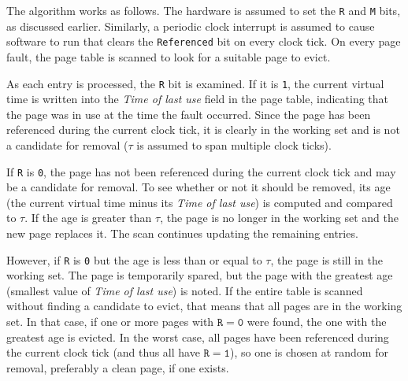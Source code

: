 The algorithm works as follows. The hardware is assumed to set the \texttt{R} and
\texttt{M} bits, as discussed earlier. Similarly, a periodic clock interrupt is assumed to
cause software to run that clears the \texttt{Referenced} bit on every clock tick. On
every page fault, the page table is scanned to look for a suitable page to
evict.

As each entry is processed, the \texttt{R} bit is examined. If it is \texttt{1}, the
current virtual time is written into the \emph{Time of last use} field in the page table,
indicating that the page was in use at the time the fault occurred. Since the page has
been referenced during the current clock tick, it is clearly in the working set and is not
a candidate for removal ($\mathtt{\tau}$ is assumed to span multiple clock ticks).

If \texttt{R} is \texttt{0}, the page has not been referenced during the current clock
tick and may be a candidate for removal. To see whether or not it should be removed, its
age (the current virtual time minus its \emph{Time of last use}) is computed and compared
to $\mathtt{\tau}$. If the age is greater than $\mathtt{\tau}$, the page is no longer in
the working set and the new page replaces it. The scan continues updating the remaining
entries.

However, if \texttt{R} is \texttt{0} but the age is less than or equal to $\mathtt{\tau}$,
the page is still in the working set. The page is temporarily spared, but the page with
the greatest age (smallest value of \emph{Time of last use}) is noted. If the entire table
is scanned without finding a candidate to evict, that means that all pages are in the
working set. In that case, if one or more pages with $\mathtt{R = 0}$ were found, the one
with the greatest age is evicted. In the worst case, all pages have been referenced during
the current clock tick (and thus all have $\mathtt{R = 1}$), so one is chosen at random
for removal, preferably a clean page, if one exists.

